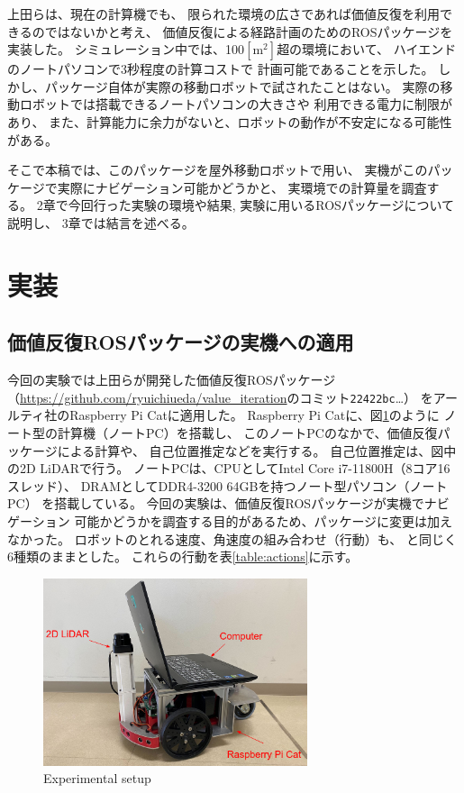 \documentclass{jarticle}
\begin{document}
上田らは、現在の計算機でも、
限られた環境の広さであれば価値反復を利用できるのではないかと考え、
価値反復による経路計画のためのROSパッケージを実装した\cite{上田rsj2021}。
シミュレーション中では、100$\mathrm{[m^2]}$超の環境において、
ハイエンドのノートパソコンで3秒程度の計算コストで
計画可能であることを示した。
しかし、パッケージ自体が実際の移動ロボットで試されたことはない。
実際の移動ロボットでは搭載できるノートパソコンの大きさや
利用できる電力に制限があり、
また、計算能力に余力がないと、ロボットの動作が不安定になる可能性がある。


そこで本稿では、このパッケージを屋外移動ロボットで用い、
実機がこのパッケージで実際にナビゲーション可能かどうかと、
実環境での計算量を調査する。
2章で今回行った実験の環境や結果, 実験に用いるROSパッケージについて説明し、
3章では結言を述べる。

\section{実装}%

\subsection{価値反復ROSパッケージの実機への適用}

今回の実験では上田らが開発した価値反復ROSパッケージ
（\url{https://github.com/ryuichiueda/value_iteration}のコミット\texttt{22422bc}\dots）
\cite{上田rsj2021}をアールティ社のRaspberry Pi Catに適用した。
Raspberry Pi Catに、図\ref{fig:raspicat}のように
ノート型の計算機（ノートPC）を搭載し、
このノートPCのなかで、価値反復パッケージによる計算や、
自己位置推定などを実行する。
自己位置推定は、図中の2D LiDARで行う。
ノートPCは、CPUとしてIntel Core i7-11800H（8コア16スレッド）、
DRAMとしてDDR4-3200 64GBを持つノート型パソコン（ノートPC）
を搭載している。
今回の実験は、価値反復ROSパッケージが実機でナビゲーション
可能かどうかを調査する目的があるため、パッケージに変更は加えなかった。
ロボットのとれる速度、角速度の組み合わせ（行動）も、
\cite{上田rsj2021}と同じく6種類のままとした。
これらの行動を表\ref{table:actions}に示す。

\begin{figure}[htb]
  \centering
   \includegraphics[height=55mm]{./figs/raspicat.png}
   \caption{Experimental setup}
	\label{fig:raspicat}
\end{figure}
\end{document}
